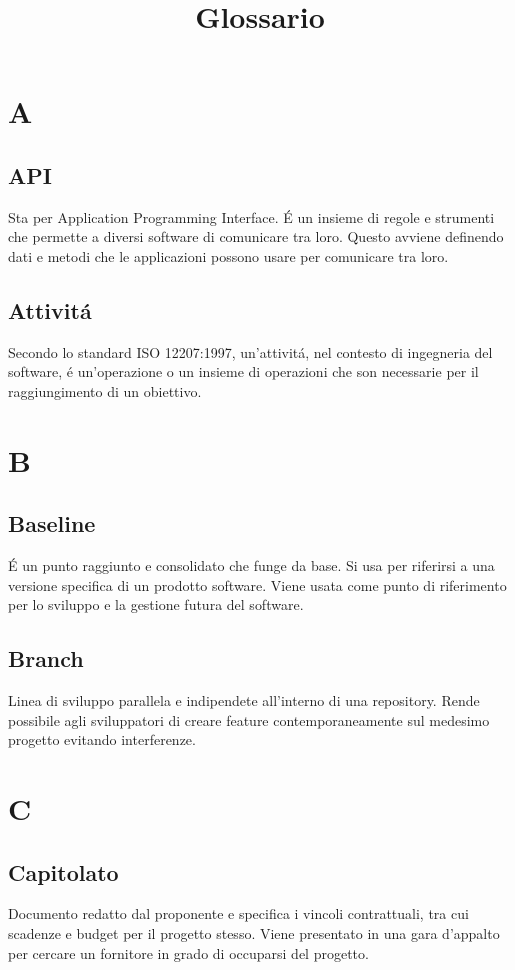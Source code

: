 \documentclass[12pt]{article}
\title{Glossario}
\begin{document}
	\makefirstpage
	
	
	\clearpage
	
	\tableofcontents
	\clearpage
	
	\section{A}
		\subsection{API}
			Sta per Application Programming Interface. \'E un insieme di regole e strumenti che permette a diversi software di comunicare tra loro. Questo avviene definendo dati e metodi che le applicazioni possono usare per comunicare tra loro.
		\subsection{Attivit\'a}
			Secondo lo standard ISO 12207:1997, un'attivit\'a, nel contesto di ingegneria del software, \'e un'operazione o un insieme di operazioni che son necessarie per il raggiungimento di un obiettivo. 
	\clearpage	
	\section{B}
		\subsection{Baseline}
			\'E un punto raggiunto e consolidato che funge da base. Si usa per riferirsi a una versione specifica di un prodotto software. Viene usata come punto di riferimento per lo sviluppo e la gestione futura del software.
		\subsection{Branch}
			Linea di sviluppo parallela e indipendete all'interno di una repository. Rende possibile agli sviluppatori di creare feature contemporaneamente sul medesimo progetto evitando interferenze.
	\clearpage	
	\section{C}
		\subsection{Capitolato}
			Documento redatto dal proponente e specifica i vincoli contrattuali, tra cui scadenze e budget per il progetto stesso. Viene presentato in una gara d'appalto per cercare un fornitore in grado di occuparsi del progetto.
\end{document}
